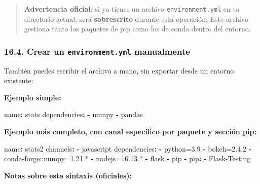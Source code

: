 \documentclass[
  doc,
  floatsintext,
  longtable,
  a4paper,
  nolmodern,
  notxfonts,
  notimes,
  12pt,
  colorlinks=true,linkcolor=blue,citecolor=blue,urlcolor=blue]{apa7}
\newenvironment{Shaded}{\begin{snugshade}}{\end{snugshade}}
\newcommand{\AttributeTok}[1]{\textcolor[rgb]{0.40,0.45,0.13}{#1}}
\newcommand{\FunctionTok}[1]{\textcolor[rgb]{0.28,0.35,0.67}{#1}}
\newcommand{\KeywordTok}[1]{\textcolor[rgb]{0.00,0.23,0.31}{\textbf{#1}}}
\begin{document}
\begin{quote}
\textbf{Advertencia oficial}: si ya tienes un archivo
\texttt{environment.yml} en tu directorio actual, será
\textbf{sobrescrito} durante esta operación. Este archivo gestiona tanto
los paquetes de pip como los de conda dentro del entorno.
\end{quote}

\subsubsection{\texorpdfstring{16.4. Crear un \texttt{environment.yml}
manualmente}{16.4. Crear un environment.yml manualmente}}\label{crear-un-environment.yml-manualmente}

También puedes escribir el archivo a mano, sin exportar desde un entorno
existente:

\textbf{Ejemplo simple:}

\begin{Shaded}
\begin{Highlighting}[]
\FunctionTok{name}\KeywordTok{:}\AttributeTok{ stats}
\FunctionTok{dependencies}\KeywordTok{:}
\AttributeTok{  }\KeywordTok{{-}}\AttributeTok{ numpy}
\AttributeTok{  }\KeywordTok{{-}}\AttributeTok{ pandas}
\end{Highlighting}
\end{Shaded}

\textbf{Ejemplo más completo, con canal específico por paquete y sección
pip:}

\begin{Shaded}
\begin{Highlighting}[]
\FunctionTok{name}\KeywordTok{:}\AttributeTok{ stats2}
\FunctionTok{channels}\KeywordTok{:}
\AttributeTok{  }\KeywordTok{{-}}\AttributeTok{ javascript}
\FunctionTok{dependencies}\KeywordTok{:}
\AttributeTok{  }\KeywordTok{{-}}\AttributeTok{ python=3.9}
\AttributeTok{  }\KeywordTok{{-}}\AttributeTok{ bokeh=2.4.2}
\AttributeTok{  }\KeywordTok{{-}}\AttributeTok{ conda{-}forge::numpy=1.21.*}
\AttributeTok{  }\KeywordTok{{-}}\AttributeTok{ nodejs=16.13.*}
\AttributeTok{  }\KeywordTok{{-}}\AttributeTok{ flask}
\AttributeTok{  }\KeywordTok{{-}}\AttributeTok{ pip}
\AttributeTok{  }\KeywordTok{{-}}\AttributeTok{ }\FunctionTok{pip}\KeywordTok{:}
\AttributeTok{    }\KeywordTok{{-}}\AttributeTok{ Flask{-}Testing}
\end{Highlighting}
\end{Shaded}

\textbf{Notas sobre esta sintaxis (oficiales):}
\end{document}

